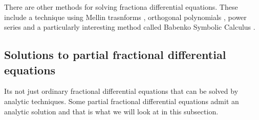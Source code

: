 There are other methods for solving fractiona differential equations. These include a technique using Mellin trasnforms \cite{Podlubny1999, Kober1940, Samko1993, Butera2014}, orthogonal polynomials \cite{Podlubny1999}, power series \cite{Podlubny1999, Samko1993, Arikoglu2007} and a particularly interesting method called Babenko Symbolic Calculus \cite{Podlubny1999, Gorenflo1997b}.

\subsection{Solutions to partial fractional differential equations}
Its not just ordinary fractional differential equations that can be solved by analytic techniques. Some partial fractional differential equations admit an analytic solution and that is what we will look at in this subsection.

